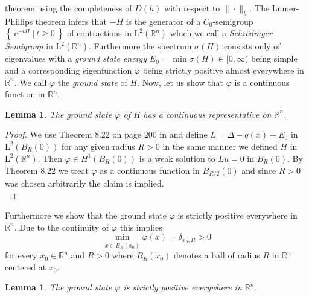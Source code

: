 \documentclass[12pt,longbibliography]{article}
\def\R{\mathbb{R}}
\newtheorem{lem}[thm]{Lemma}
\theoremstyle{definition}
\theoremstyle{remark}
\theoremstyle{example}
\begin{document}
theorem using the completeness of $D(h)$ with respect to $\| \cdot \|_{h}$. 
The Lumer-Phillips theorem infers that $-H$ is the generator of a $C_{0}$-semigroup 
$\left\{ \ \mathrm{e}^{-tH} \ | \ t \geq 0 \ \right\}$
of contractions in $\mathrm{L}^{2} \left( \R^{n} \right)$ which we call a \textit{Schrödinger Semigroup} in 
$\mathrm{L}^{2} \left( \R^{n} \right)$. Furthermore the spectrum 
$\sigma(H)$ consists only of eigenvalues with a \textit{ground state energy} $E_{0} = \min \sigma(H) \in [0,\infty)$ being simple
and a corresponding eigenfunction $\varphi$ being strictly positive almost everywhere in $\R^{n}$. We call $\varphi$ the 
\textit{ground state} of $H$. Now, let us show that $\varphi$ is a continuous function in $\R^{n}$.\\

\begin{lem}\label{ground_state_continuous}
The ground state $\varphi$ of $H$ has a continuous representative on $\R^{n}$.\\
\end{lem} 

\begin{proof}
We use Theorem 8.22 on page 200 in \cite{GilbargTrudinger01} and define $L= \Delta - q(x) + E_{0}$ 
in $\mathrm{L}^{2}\left( B_{R}(0) \right)$ for any given radius $R>0$
in the same manner we defined $H$ in $\mathrm{L}^{2}\left( \R^{n} \right)$.
Then $\varphi \in H^{1}\left( B_{R}(0) \right)$ is a weak
solution to $Lu = 0$ in $B_{R}(0)$. By Theorem 8.22 we treat $\varphi$ as a continuous function in $B_{R/2}(0)$ and since
$R > 0$ was chosen arbitrarily the claim is implied.\\
\end{proof}

Furthermore we show that the ground state $\varphi$ is 
strictly positive everywhere in $\R^{n}$. Due to the continuity of $\varphi$ this implies 
$$
\min_{x \in \overline{B_{R}(x_{0})}} \varphi(x) = \delta_{x_{0},R} > 0
$$ 
for every $x_{0} \in \R^{n}$ and $R > 0$ where $B_{R}(x_{0})$ denotes a ball of radius $R$ in $\R^{n}$ centered at $x_{0}$.\\

\begin{lem}\label{strict_positivity_ground_state}
The ground state $\varphi$ is strictly positive everywhere in $\R^{n}$.\\
\end{lem}
\end{document}
